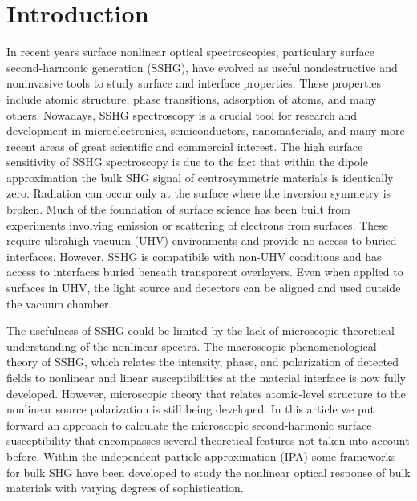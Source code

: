 \documentclass[floatfix,prb,aps,superscriptaddress,showpacs,11pt,preprint,letterpaper]{revtex4}
\begin{document}
\maketitle

\section{Introduction}\label{intro}

In recent years surface nonlinear optical spectroscopies, particulary surface 
second-harmonic generation (SSHG), have evolved as useful nondestructive 
and noninvasive tools to study surface and interface properties. These 
properties include atomic structure, phase transitions, adsorption of 
atoms, and many others.\cite{daumPRL93, mcgilpOE94, meyerPRL95, powerPRL95, 
godefroyAPL96, hoferAPA96, dadapPRB97, bloembergenAPB99, mcgilpSRL99, 
suzukiAPB99, mitchellSS01, hughesPRB96, guyotPRB88, downerPSSA01, shenAPB99, 
shenNAT89, chenPRL81, mendozaPRL98, downerSIA01} Nowadays, SSHG spectroscopy 
is a crucial tool for research and development in microelectronics,
\cite{zheltikovLP00} semiconductors, \cite{lupkeSSR99} nanomaterials,
\cite{salazar-aparicioPRB14} and many more recent areas of great scientific 
and commercial interest.\cite{cazzanelliNM14} The high surface sensitivity 
of SSHG spectroscopy is due to the fact that within the dipole approximation 
the bulk SHG signal of centrosymmetric materials is identically zero. 
Radiation can occur only at the surface where the inversion symmetry is 
broken. Much of the foundation of surface science has been built from 
experiments involving emission or scattering of electrons from surfaces. 
These require ultrahigh vacuum (UHV) environments and provide no access to 
buried interfaces. However, SSHG is compatibile with non-UHV conditions and 
has access to interfaces buried beneath transparent overlayers. Even when 
applied to surfaces in UHV, the light source and detectors can be aligned and
used outside the vacuum chamber. 

The usefulness of SSHG could be limited by the lack of microscopic theoretical
understanding of the nonlinear spectra. The macroscopic phenomenological 
theory of SSHG, which relates the intensity, phase, and polarization of 
detected fields to nonlinear and linear susceptibilities at the material 
interface is now fully developed. However, microscopic theory that relates 
atomic-level structure to the nonlinear source polarization is still being 
developed. In this article we put forward an approach to calculate the
microscopic second-harmonic surface susceptibility that encompasses several
theoretical features not taken into account before. Within the independent 
particle approximation (IPA) some frameworks for bulk SHG have been developed 
to study the nonlinear optical response of bulk materials with varying degrees 
of sophistication.\cite{butcherPOPS63, aspnesPRB72, sipePRB93, levinePRB94,
aversaPRB95, hughesPRB96, rashkeevPRB98} 
\end{document}
